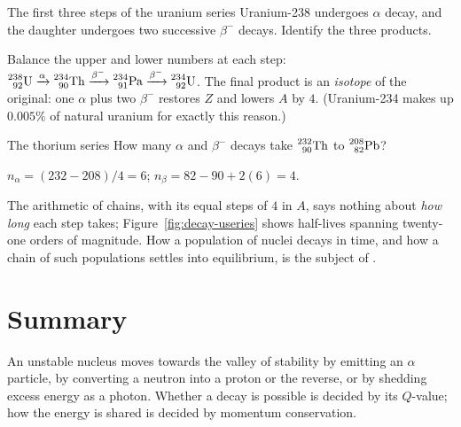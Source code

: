 \begin{exbox}{The first three steps of the uranium series}\label{ex:decay-ufirst}
Uranium-238 undergoes $\alpha$ decay, and the daughter undergoes two successive $\beta^-$ decays. Identify the
three products.

Balance the upper and lower numbers at each step:
$\prescript{238}{92}{\mathrm{U}}\xrightarrow{\alpha}\prescript{234}{90}{\mathrm{Th}}\xrightarrow{\beta^-}\prescript{234}{91}{\mathrm{Pa}}\xrightarrow{\beta^-}\prescript{234}{92}{\mathrm{U}}$.
The final product is an \emph{isotope} of the original: one $\alpha$ plus two $\beta^-$ restores $Z$ and
lowers $A$ by $4$. (Uranium-234 makes up $0.005\%$ of natural uranium for exactly this reason.)
\end{exbox}

\begin{exbox}{The thorium series}\label{ex:decay-thseries}
How many $\alpha$ and $\beta^-$ decays take $\prescript{232}{90}{\mathrm{Th}}$ to $\prescript{208}{82}{\mathrm{Pb}}$?

$n_\alpha=(232-208)/4=6$; $n_\beta=82-90+2(6)=4$. 
\end{exbox}

The arithmetic of chains, with its equal steps of $4$ in $A$, says nothing about \emph{how long} each step
takes; Figure~\ref{fig:decay-useries} shows half-lives spanning twenty-one orders of magnitude. How a
population of nuclei decays in time, and how a chain of such populations settles into equilibrium, is the
subject of .

\section{Summary}\label{sec:summary-decay}
An unstable nucleus moves towards the valley of stability by emitting an $\alpha$ particle, by converting
a neutron into a proton or the reverse, or by shedding excess energy as a photon. Whether a decay is
possible is decided by its $Q$-value; how the energy is shared is decided by momentum conservation.

